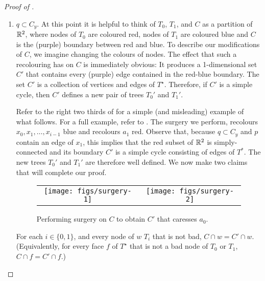 \documentclass{patmorin}
\newcommand{\dual}[1]{{#1}^\star}
\begin{document}
\begin{proof}[Proof of ]
\begin{enumerate}
   \item $q\subset C_y$.  At this point it is helpful to think of
   $T_0$, $T_1$, and $C$ as a partition of $\mathbb{R}^2$, where nodes of $T_0$
   are coloured red, nodes of $T_1$ are coloured blue and $C$ is the
   (purple) boundary between red and blue.  To describe our modifications
   of $C$, we imagine changing the colours of nodes.  The effect that
   such a recolouring has on $C$ is immediately obvious: It produces a
   1-dimensional set $C'$ that contains every (purple) edge contained in
   the red-blue boundary. The set $C'$ is a collection of vertices and
   edges of $\dual{T}$. Therefore, if $C'$ is a simple cycle, then $C'$
   defines a new pair of trees $T_0'$ and $T_1'$.


   Refer to the right two thirds of  for a simple
   (and misleading) example of what follows. For a full example,
   refer to .  The surgery we perform, recolours
   $x_0,x_1,\ldots,x_{i-1}$ blue and recolours $a_1$ red.  Observe that,
   because $q\subset C_y$ and $p$ contain an edge of $x_1$, this implies
   that the red subset of $\mathbb{R}^2$ is simply-connected and its boundary $C'$
   is a simple cycle consisting of edges of $T^*$.  The new trees $T_0'$
   and $T_1'$ are therefore well defined.  We now make two claims that
   will complete our proof.

   \begin{figure}
     \begin{center}
       \begin{tabular}{cc}
         \texttt{[image: figs/surgery-1]} &
         \texttt{[image: figs/surgery-2]} 
       \end{tabular}
     \end{center}
     \caption{Performing surgery on $C$ to obtain $C'$ that caresses $a_0$.}
   \end{figure}

   \begin{clm}
      For each $i\in\{0,1\}$, and every node of $w$ $T_i$ that is not bad,
      $C\cap w=C'\cap w$.  (Equivalently, for every face $f$ of $\dual{T}$
      that is not a bad node of $T_0$ or $T_1$, $C\cap f=C'\cap f$.)
   \end{clm}


\end{enumerate}
\end{proof}
\end{document}
